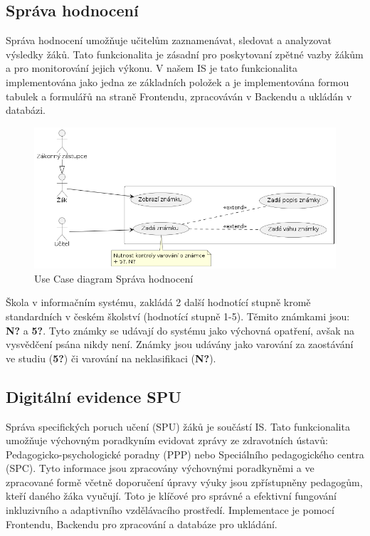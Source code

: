 \documentclass[FM,Proj]{tulthesis}
\begin{document}
\subsection*{Správa hodnocení}
Správa hodnocení umožňuje učitelům zaznamenávat, sledovat a analyzovat výsledky žáků. Tato
funkcionalita je zásadní pro poskytovaní zpětné vazby žákům a pro monitorování jejich výkonu.
V našem IS je tato funkcionalita implementována jako jedna ze základních položek a je 
implementována formou tabulek a formulářů na straně Frontendu, zpracováván v Backendu a
ukládán v databázi.

\begin{figure}[H]
    \includegraphics[width=\textwidth-28pt]{uc-sprava-hodnoceni.png}
    \caption{Use Case diagram Správa hodnocení}
    \label{fig:uc-sprava-hodnoceni}
\end{figure}

Škola v informačním systému, zakládá 2 další hodnotící stupně kromě standardních 
v českém školství (hodnotící stupně 1-5). Těmito známkami jsou: \textbf{N?} 
a \textbf{5?}. Tyto známky se udávají do systému jako výchovná opatření,
avšak na vysvědčení psána nikdy není. Známky jsou udávány jako varování za 
zaostávání ve studiu (\textbf{5?}) či varování na neklasifikaci (\textbf{N?}).

\subsection*{Digitální evidence SPU}
Správa specifických poruch učení (SPU) žáků je součástí IS. Tato funkcionalita umožňuje
výchovným poradkyním evidovat zprávy ze zdravotních ústavů: Pedagogicko-psychologické 
poradny (PPP) nebo Speciálního pedagogického centra (SPC). Tyto informace
jsou zpracovány výchovnými poradkyněmi a ve zpracované formě včetně doporučení úpravy
výuky jsou zpřístupněny pedagogům, kteří daného žáka vyučují. Toto je klíčové pro
správné a efektivní fungování inkluzivního a adaptivního vzdělávacího prostředí.
Implementace je pomocí Frontendu, Backendu pro zpracování a databáze pro ukládání.
\end{document}
